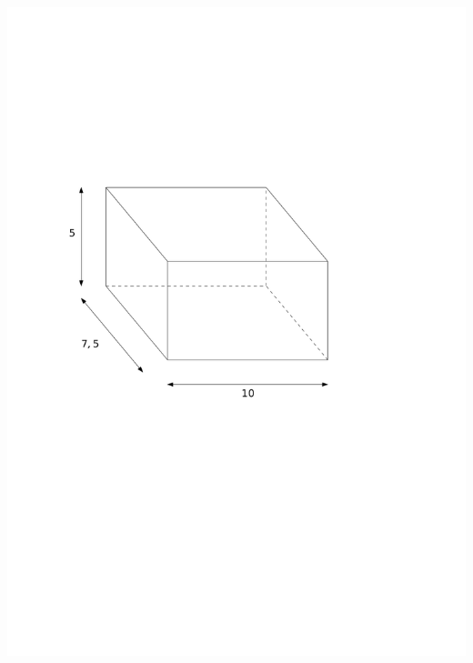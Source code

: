\documentclass[a4paper,11pt]{report}
\begin{document}
\begin{exo}
{\begin{tasks}
    \task ~\\ \includegraphics[scale=0.5]{media/gm-02/pave3.pdf}

\end{tasks}}
\end{exo}
\end{document}
